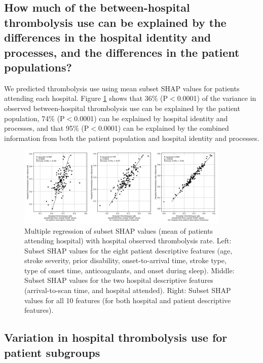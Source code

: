 \subsection{How much of the between-hospital thrombolysis use can be explained by the differences in the hospital identity and processes, and the differences in the patient populations?}

We predicted thrombolysis use using mean subset SHAP values for patients attending each hospital. Figure \ref{fig:shap_multiple_regression} shows that 36\% (P$<$0.0001) of the variance in observed between-hospital thrombolysis use can be explained by the patient population, 74\% (P$<$0.0001) can be explained by hospital identity and processes, and that 95\% (P$<$0.0001) can be explained by the combined information from both the patient population and hospital identity and processes. 

\begin{figure}[!h]
    \centering
    \includegraphics[width=0.9\textwidth]{./images/03f_xgb_10_features_multiple_regression_patient_hospital}
    \caption{Multiple regression of subset SHAP values (mean of patients attending hospital) with hospital observed thrombolysis rate. Left: Subset SHAP values for the eight patient descriptive features (age, stroke severity, prior disability, onset-to-arrival time, stroke type, type of onset time, anticoagulants, and onset during sleep). Middle: Subset SHAP values for the two hospital descriptive features (arrival-to-scan time, and hospital attended). Right: Subset SHAP values for all 10 features (for both hospital and patient descriptive features).}
  \label{fig:shap_multiple_regression}
\end{figure}

\subsection{Variation in hospital thrombolysis use for patient subgroups}

